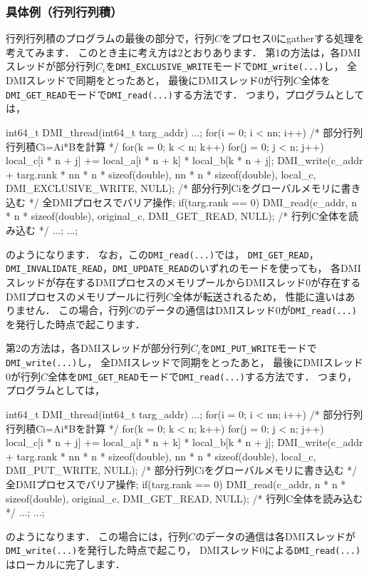 \documentclass[report,12pt]{jsbook}
\begin{document}
\subsubsection{具体例（行列行列積）}

行列行列積のプログラムの最後の部分で，行列$C$をプロセス0にgatherする処理を考えてみます．
このとき主に考え方は2とおりあります．
第1の方法は，各DMIスレッドが部分行列$C_i$を\texttt{DMI\_EXCLUSIVE\_WRITE}モードで\texttt{DMI\_write(...)}し，
全DMIスレッドで同期をとったあと，
最後にDMIスレッド0が行列$C$全体を\texttt{DMI\_GET\_READ}モードで\texttt{DMI\_read(...)}する方法です．
つまり，プログラムとしては，
\begin{code}
int64_t DMI_thread(int64_t targ_addr)
{
  ...;
  for(i = 0; i < nn; i++)  /* 部分行列行列積Ci=Ai*Bを計算 */
    {
      for(k = 0; k < n; k++)
       {
          for(j = 0; j < n; j++)
            {
              local_c[i * n + j] += local_a[i * n + k] * local_b[k * n + j];
            } 
        }   
    }   
  DMI_write(c_addr + targ.rank * nn * n * sizeof(double), nn * n * sizeof(double), local_c, DMI_EXCLUSIVE_WRITE, NULL);  /* 部分行列Ciをグローバルメモリに書き込む */
  全DMIプロセスでバリア操作;
  if(targ.rank == 0)
    {
      DMI_read(c_addr, n * n * sizeof(double), original_c, DMI_GET_READ, NULL);  /* 行列C全体を読み込む */
      ...;
    }
  ...;
}
\end{code}
のようになります．
なお，この\texttt{DMI\_read(...)}では，
\texttt{DMI\_GET\_READ}，\texttt{DMI\_INVALIDATE\_READ}，\texttt{DMI\_UPDATE\_READ}のいずれのモードを使っても，
各DMIスレッドが存在するDMIプロセスのメモリプールからDMIスレッド0が存在するDMIプロセスのメモリプールに行列$C$全体が転送されるため，
性能に違いはありません．
この場合，行列$C$のデータの通信はDMIスレッド0が\texttt{DMI\_read(...)}を発行した時点で起こります．

第2の方法は，各DMIスレッドが部分行列$C_i$を\texttt{DMI\_PUT\_WRITE}モードで\texttt{DMI\_write(...)}し，
全DMIスレッドで同期をとったあと，
最後にDMIスレッド0が行列$C$全体を\texttt{DMI\_GET\_READ}モードで\texttt{DMI\_read(...)}する方法です．
つまり，プログラムとしては，
\begin{code}
int64_t DMI_thread(int64_t targ_addr)
{
  ...;
  for(i = 0; i < nn; i++)  /* 部分行列行列積Ci=Ai*Bを計算 */
    {
      for(k = 0; k < n; k++)
       {
          for(j = 0; j < n; j++)
            {
              local_c[i * n + j] += local_a[i * n + k] * local_b[k * n + j];
            } 
        }   
    }   
  DMI_write(c_addr + targ.rank * nn * n * sizeof(double), nn * n * sizeof(double), local_c, DMI_PUT_WRITE, NULL);  /* 部分行列Ciをグローバルメモリに書き込む */
  全DMIプロセスでバリア操作;
  if(targ.rank == 0)
    {
      DMI_read(c_addr, n * n * sizeof(double), original_c, DMI_GET_READ, NULL);  /* 行列C全体を読み込む */
      ...;
    }
  ...;
}
\end{code}
のようになります．
この場合には，行列$C$のデータの通信は各DMIスレッドが\texttt{DMI\_write(...)}を発行した時点で起こり，
DMIスレッド0による\texttt{DMI\_read(...)}はローカルに完了します．
\end{document}
